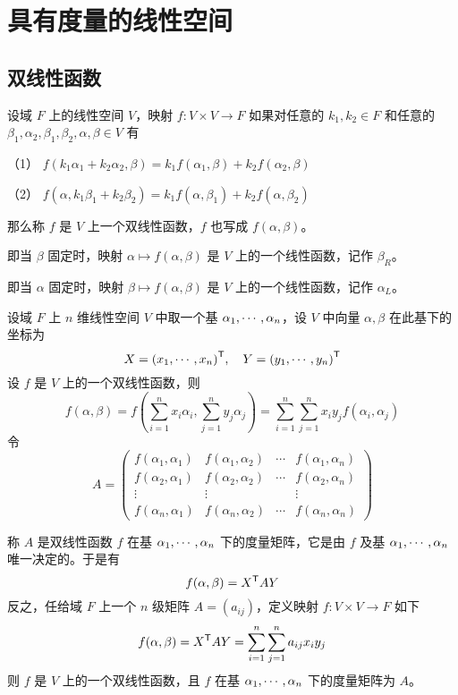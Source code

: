 \chapter{具有度量的线性空间}

\section{双线性函数}

\begin{definition}[双线性函数]
    设域 $F$ 上的线性空间 $V$，映射 $f : V \times V \to F$ 如果对任意的 $k_1,k_2 \in F$ 和任意的 $\beta_1,\alpha_2,\beta_1,\beta_2,\alpha,\beta \in V$ 有
    
    （1） $f(k_1\alpha_1 + k_2\alpha_2,\beta) = k_1 f(\alpha_1,\beta) + k_2f(\alpha_2,\beta)$
    
    （2） $f(\alpha,k_1\beta_1 + k_2\beta_2) = k_1 f(\alpha,\beta_1) + k_2f(\alpha,\beta_2)$
    
    那么称 $f$ 是 $V$ 上一个双线性函数，$f$ 也写成 $f(\alpha,\beta)$。
\end{definition}

即当 $\beta$ 固定时，映射 $\alpha \mapsto f(\alpha,\beta)$ 是 $V$ 上的一个线性函数，记作 $\beta_R$。

即当 $\alpha$ 固定时，映射 $\beta \mapsto f(\alpha,\beta)$ 是 $V$ 上的一个线性函数，记作 $\alpha_L$。

设域 $F$ 上 $n$ 维线性空间 $V$ 中取一个基 $\alpha_1,\cdots,\alpha_n$，设 $V$ 中向量 $\alpha,\beta$ 在此基下的坐标为
\[ X = {(x_1,\cdots,x_n)}^\mathsf{T}, \quad Y = {(y_1,\cdots,y_n)}^\mathsf{T} \]
设 $f$ 是 $V$ 上的一个双线性函数，则
\[ f(\alpha,\beta) = f\left( \sum_{i=1}^n x_i\alpha_i,\sum_{j=1}^ny_j\alpha_j \right) = \sum_{i=1}^n\sum_{j=1}^n x_iy_jf(\alpha_i,\alpha_j) \]
令
\[ A = \left(\begin{matrix}
            f(\alpha_1,\alpha_1) & f(\alpha_1,\alpha_2) & \cdots & f(\alpha_1,\alpha_n)  \\
            f(\alpha_2,\alpha_1) & f(\alpha_2,\alpha_2) & \cdots & f(\alpha_2,\alpha_n)  \\
            \vdots               & \vdots               &        & \vdots                \\
            f(\alpha_n,\alpha_1) & f(\alpha_n,\alpha_2) & \cdots & f(\alpha_n,\alpha_n)
        \end{matrix}\right) \]

称 $A$ 是双线性函数 $f$ 在基 $\alpha_1,\cdots,\alpha_n$ 下的度量矩阵，它是由 $f$ 及基 $\alpha_1,\cdots,\alpha_n$ 唯一决定的。于是有
\[ f(\alpha,\beta) = {X}^\mathsf{T}AY \]
反之，任给域 $F$ 上一个 $n$ 级矩阵 $A = (a_{ij})$，定义映射 $f : V \times V \to F$ 如下
\[ f(\alpha,\beta) = {X}^\mathsf{T}AY = \sum_{i=1}^n\sum_{j=1}^na_{ij}x_iy_j \]
则 $f$ 是 $V$ 上的一个双线性函数，且 $f$ 在基 $\alpha_1,\cdots,\alpha_n$ 下的度量矩阵为 $A$。

